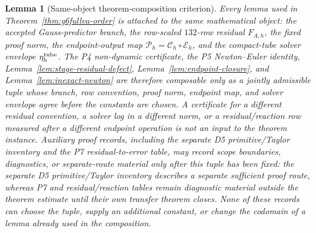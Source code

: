 \documentclass[preprint,12pt]{elsarticle}
\newtheorem{lemma}{Lemma}
\begin{document}
\begin{lemma}[Same-object theorem-composition criterion]
\label{lem:same-object-composition}
Every lemma used in Theorem~\ref{thm:g6fullva-order} is attached to the same
mathematical object: the accepted Gauss-predictor branch, the row-scaled
\(132\)-row residual \(F_{A,h}\), the fixed proof norm, the endpoint-output
map \(\mathcal P_h=\mathcal C_h\circ\mathcal E_h\), and the compact-tube
solver envelope \(\eta_h^{\rm tube}\).  The P4 non-dynamic certificate, the
P5 Newton--Euler identity, Lemma~\ref{lem:stage-residual-defect},
Lemma~\ref{lem:endpoint-closure}, and Lemma~\ref{lem:inexact-newton} are
therefore composable only as a jointly admissible tuple whose branch, row
convention, proof norm, endpoint map, and solver envelope agree before the
constants are chosen.  A certificate for a different residual convention, a
solver log in a different norm, or a residual/reaction row measured after a
different endpoint operation is not an input to the theorem instance.
Auxiliary proof records, including the separate D5 primitive/Taylor inventory
and the P7 residual-to-error table, may record scope boundaries, diagnostics,
or separate-route material only after this tuple has been fixed: the separate
D5 primitive/Taylor inventory describes a separate sufficient proof route, whereas
P7 and residual/reaction tables remain diagnostic material outside the theorem estimate
until their own transfer theorem closes.  None of these records can
choose the tuple, supply an additional constant, or change the codomain of a
lemma already used in the composition.
\end{lemma}
\end{document}
